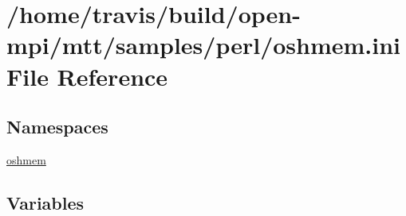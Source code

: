 \hypertarget{oshmem_8ini}{\section{/home/travis/build/open-\/mpi/mtt/samples/perl/oshmem.ini File Reference}
\label{oshmem_8ini}
}
\subsection*{Namespaces}
\begin{DoxyCompactItemize}
\item 
\hyperlink{namespaceoshmem}{oshmem}
\end{DoxyCompactItemize}
\subsection*{Variables}
